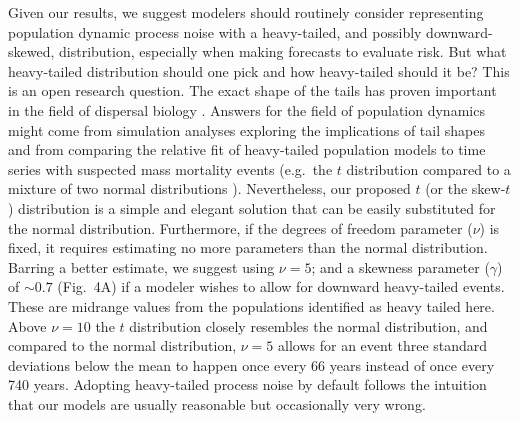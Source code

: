 \documentclass[9pt,twocolumn,twoside]{pnas-new}
\begin{document}

Given our results, we suggest modelers should routinely consider representing population dynamic
process noise with a heavy-tailed, and possibly downward-skewed, distribution,
especially when making forecasts to evaluate risk.
But what heavy-tailed distribution should one pick
and how heavy-tailed should it be?
This is an open research question.
The exact shape of the tails has proven important
in the field of dispersal biology \cite{kot1996, clark1999}.
Answers for the field of population dynamics
might come from simulation analyses exploring
the implications of tail shapes and
from comparing the relative fit of heavy-tailed
population models to time series
with suspected mass mortality events
(e.g.~the $t$ distribution compared to a mixture
of two normal distributions \cite{ward2007}).
Nevertheless, our proposed $t$ (or the skew-$t$) distribution
is a simple and elegant solution that
can be easily substituted for the normal distribution.
Furthermore, if the degrees of freedom parameter ($\nu$)
is fixed,
it requires estimating no more parameters
than the normal distribution.
Barring a better estimate,
we suggest using $\nu = 5$; and
a skewness parameter ($\gamma$) of $\sim 0.7$ (Fig.~4A)
if a modeler wishes to allow for downward heavy-tailed events.
These are midrange values from the populations identified as heavy tailed here.
Above $\nu  =  10$ the $t$ distribution closely resembles
the normal distribution,
and compared to the normal distribution, $\nu  = 5$ allows for an event
three standard deviations below the mean to happen
once every 66 years instead of once every 740 years.
Adopting heavy-tailed process noise by default follows the intuition
that our models are usually reasonable but occasionally very wrong.
\end{document}
